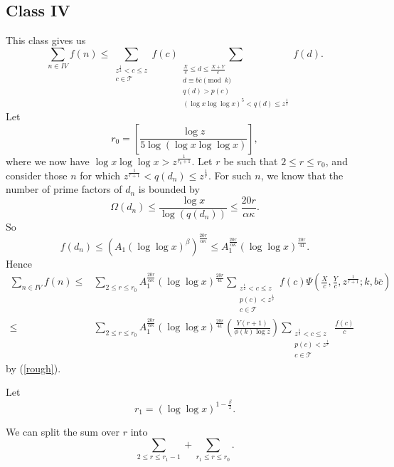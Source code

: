 \documentclass{amsart}
\begin{document}
\subsection{Class IV}
This class gives us
$$\sum_{n\in IV}f(n)\leq \sum_{\substack{z^\frac 12<c\leq z \\ c\in \mathcal T
}}f(c)\sum_{\substack{\frac Xc\leq d\leq \frac{X+Y}{c} \\ d\equiv b\overline{c}\pmod k \\ q(d)>p(c) \\ (\log x\log\log x)^5< q(d)\leq z^\frac 12}}f(d).$$
Let 
$$r_0=\left[\frac{\log z}{5\log(\log x\log \log x)}\right],$$
where we now have $\log x\log \log x>z^{\frac{1}{r_0+1}}$.  Let $r$ be such that $2\leq r\leq r_0$, and consider those $n$ for which $z^{\frac{1}{r+1}}<q(d_n)\leq z^\frac 1r$. For such $n$, we know that the number of prime factors of $d_n$ is bounded by
$$\Omega(d_n)\leq \frac{\log x}{\log(q(d_n))}\leq \frac{20r}{\alpha\kappa}.$$
So
$$f(d_n)\leq \left(A_1(\log\log x)^\beta\right)^{\frac{20r}{\alpha\kappa}}\leq  A_1^{\frac{20r}{\alpha\kappa}}\left(\log\log x\right)^{\frac{20r}{41}}.$$
Hence
\begin{align*}
\sum_{n\in IV}f(n)\leq  &\sum_{2\leq r\leq r_0}A_1^{\frac{20r}{\alpha\kappa}}\left(\log\log x\right)^{\frac{20r}{41}}\sum_{\substack{z^\frac 12<c\leq z \\ p(c)<z^\frac 1r \\ c\in \mathcal T}}f(c)\Psi\left(\frac Xc,\frac Yc,z^\frac{1}{r+1};k,b\overline{c}\right)\\
\leq  &\sum_{2\leq r\leq r_0}A_1^{\frac{20r}{\alpha\kappa}}\left(\log\log x\right)^{\frac{20r}{41}}\left(\frac{Y(r+1)}{\phi(k)\log z}\right)\sum_{\substack{z^\frac 12<c\leq z \\ p(c)<z^\frac 1r \\ c\in \mathcal T}}\frac{f(c)}{c}
\end{align*}
by (\ref{rough}).

Let $$r_1=(\log\log x)^{1-\frac{\beta}{2}}.$$

We can split the sum over $r$ into
$$\sum_{2\leq r\leq r_1-1}+\sum_{r_1\leq r\leq r_0}.$$
\end{document}
